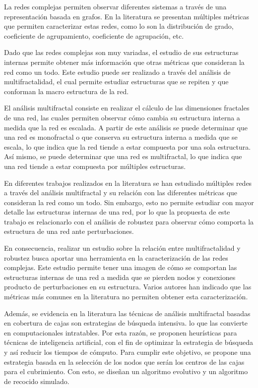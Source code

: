 La redes complejas permiten observar diferentes sistemas a través de una representación basada en grafos. En la literatura se presentan múltiples métricas que permiten caracterizar estas redes, como lo son la distribución de grado, coeficiente de agrupamiento, coeficiente de agrupación, etc. 

Dado que las redes complejas son muy variadas, el estudio de sus estructuras internas permite obtener más información que otras métricas que consideran la red como un todo. Este estudio puede ser realizado a través del análisis de multifractalidad, el cual permite estudiar estructuras que se repiten y que conforman la macro estructura de la red.

El análisis multifractal consiste en realizar el cálculo de las dimensiones fractales de una red, las cuales permiten observar cómo cambia su estructura interna a medida que la red es escalada. A partir de este análisis se puede determinar que una red es monofractal o que conserva su estructura interna a medida que se escala, lo que indica que la red tiende a estar compuesta por una sola estructura. Así mismo, se puede determinar que una red es multifractal, lo que indica que una red tiende a estar compuesta por múltiples estructuras.

En diferentes trabajos realizados en la literatura se han estudiado múltiples redes a través del análisis multifractal y su relación con las diferentes métricas que consideran la red como un todo. Sin embargo, esto no permite estudiar con mayor detalle las estructuras internas de una red, por lo que la propuesta de este trabajo es relacionarlo con el análisis de robustez para observar cómo comporta la estructura de una red ante perturbaciones. 

En consecuencia, realizar un estudio sobre la relación entre multifractalidad y robustez busca aportar una herramienta en la caracterización de las redes complejas. Este estudio permite tener una imagen de cómo se comportan las estructuras internas de una red a medida que se pierden nodos y conexiones producto de perturbaciones en su estructura. Varios autores han indicado que las métricas más comunes en la literatura no permiten obtener esta caracterización.

Además, se evidencia en la literatura las técnicas de análisis multifractal basadas en cobertura de cajas son estrategias de búsqueda intensiva. lo que las convierte en computacionales intratables. Por esta razón, se proponen heurísticas para técnicas de inteligencia artificial, con el fin de optimizar la estrategia de búsqueda y así reducir los tiempos de cómputo. Para cumplir este objetivo, se propone una estrategia basada en la selección de los nodos que serán los centros de las cajas para el cubrimiento. Con esto, se diseñan un algoritmo evolutivo y un algoritmo de recocido simulado.

